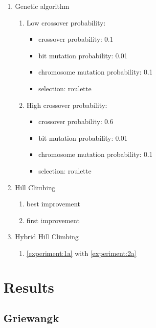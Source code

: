 \documentclass{article}
\begin{document}
\begin{enumerate} 
	\item Genetic algorithm
	\begin{enumerate}
		\item \label{experiment:1a} Low crossover probability: 
		\begin{itemize}
			\item crossover probability: 0.1
			\item bit mutation probability: 0.01
			\item chromosome mutation probability: 0.1
			\item selection: roulette
		\end{itemize} 
		\item \label{experiment:1b} High crossover probability:
		\begin{itemize}
			\item crossover probability: 0.6
			\item bit mutation probability: 0.01
			\item chromosome mutation probability: 0.1
			\item selection: roulette
		\end{itemize}
	\end{enumerate} 
	
	\item Hill Climbing
	\begin{enumerate}
		\item \label{experiment:2a} best improvement
		\item \label{experiment:2b} first improvement
	\end{enumerate}
	
	\item Hybrid Hill Climbing
	\begin{enumerate}
		\item \label{experiment:3a} \ref{experiment:1a} with \ref{experiment:2a}
	\end{enumerate}
	
\end{enumerate}

\section{Results}

\subsection{Griewangk}
\end{document}
